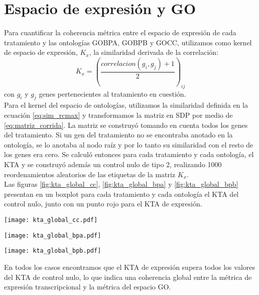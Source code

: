 \section{Espacio de expresión y GO}
Para cuantificar la coherencia métrica entre el espacio de expresión de cada tratamiento y las ontologías GOBPA, GOBPB y GOCC, utilizamos como kernel de espacio de expresión, $K_x$, la similaridad derivada de la correlación:
\begin{equation}
	K_x = (\frac{correlacion(g_i, g_j)+1}{2})_{ij}
	\label{eq:similaridad_de_correlacion}
\end{equation}
con $g_i$ y $g_j$ genes pertenecientes al tratamiento en cuestión.\\
Para el kernel del espacio de ontologías, utilizamos la similaridad definida en la ecuación \ref{eq:sim_rcmax} y transformamos la matriz en SDP por medio de \ref{eq:matriz_corrida}. La matriz se construyó tomando en cuenta todos los genes del tratamiento. Si un gen del tratamiento no se encontraba anotado en la ontología, se lo anotaba al nodo raíz y por lo tanto su similaridad con el resto de los genes era cero. Se calculó entonces para cada tratamiento y cada ontología, el KTA y se construyó además un control nulo de tipo 2, realizando 1000 reordenamientos aleatorios de las etiquetas de la matriz $K_x$.\\
Las figuras \ref{fig:kta_global_cc}, \ref{fig:kta_global_bpa} y \ref{fig:kta_global_bpb} presentan en un boxplot para cada tratamiento y cada ontología el KTA del control nulo, junto con un punto rojo para el KTA de expresión. 
\begin{center}
\texttt{[image: kta\_global\_cc.pdf]}
\label{fig:kta_global_cc}
\end{center}
\begin{center}
\texttt{[image: kta\_global\_bpa.pdf]}
\label{fig:kta_global_bpa}
\end{center}
\begin{center}
\texttt{[image: kta\_global\_bpb.pdf]}
\label{fig:kta_global_bpb}
\end{center}
En todos los casos encontramos que el KTA de expresión supera todos los valores del KTA de control nulo, lo que indica una coherencia global entre la métrica de expresión transcripcional y la métrica del espacio GO.
